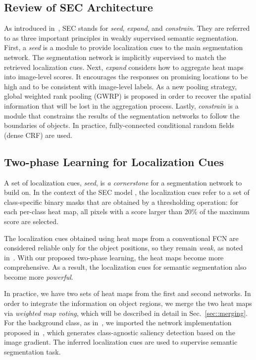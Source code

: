 \documentclass[10pt,twocolumn,letterpaper]{article}
\newcommand{\secref}[1]{Sec.~\ref{#1}}
\begin{document}
\subsection{Review of SEC Architecture}
\label{sec:SEC}

As introduced in~\cite{kolesnikov2016seed}, SEC stands for \textit{seed}, \textit{expand}, and \textit{constrain}. They are referred to as three important principles in weakly supervised semantic segmentation. First, a \textit{seed} is a module to provide localization cues to the main segmentation network. The segmentation network is implicitly supervised to match the retrieved localization cues. %
Next, \textit{expand} considers how to aggregate heat maps into image-level scores. It encourages the responses on promising locations to be high and to be consistent with image-level labels. As a new pooling strategy, global weighted rank pooling (GWRP) is proposed in order to recover the spatial information that will be lost in the aggregation process. Lastly, \textit{constrain} is a module that constrains the results of the segmentation networks to follow the boundaries of objects. In practice, fully-connected conditional random fields (dense CRF) \cite{ToyodaH08crf} are used.

\subsection{Two-phase Learning for Localization Cues}
A set of localization cues, \textit{seed}, is \textit{a cornerstone} for a segmentation network to build on. In the context of the SEC model \cite{kolesnikov2016seed}, the localization cues refer to a set of class-specific binary masks that are obtained by a thresholding operation: for each per-class heat map, all pixels with a score larger than 20\% of the maximum score are selected.

The localization cues obtained using heat maps from a conventional FCN are considered reliable only for the object positions, so they remain \textit{weak}, as noted in~\cite{Pinheiro2015CVPR,Bilen16,kolesnikov2016seed}. With our proposed two-phase learning, the heat maps become more comprehensive. As a result, the localization cues for semantic segmentation also become more \textit{powerful}.

In practice, we have two sets of heat maps from the first and second networks. In order to integrate the information on object regions, we merge the two heat maps via \textit{weighted map voting}, which will be described in detail in \secref{sec::merging}. For the background class, as in~\cite{kolesnikov2016seed},  we imported the network implementation proposed in~\cite{SimonyanVZ13bg}, which generates class-agnostic saliency detection based on the image gradient. The inferred localization cues are used to supervise semantic segmentation task.
\end{document}
